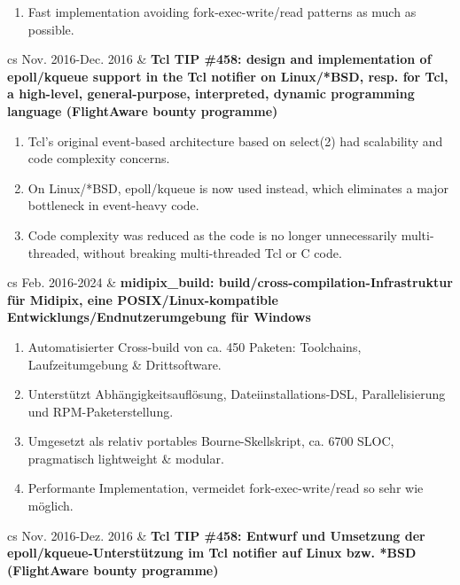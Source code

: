 \documentclass{article}
\begin{document}
\begin{table}
{\begin{enumerate}
      \item Fast implementation avoiding fork-exec-write/read patterns as much as possible.
    \end{enumerate}
    \begin{tabularx}{\linewidth}{cs}
      Nov. 2016-Dec. 2016 & \bf{Tcl TIP \#458: design and implementation of epoll/kqueue support in the Tcl notifier on Linux/*BSD, resp. for Tcl, a high-level, general-purpose, interpreted, dynamic programming language (FlightAware bounty programme)}
    \end{tabularx}
    \begin{enumerate}
      \item Tcl's original event-based architecture based on select(2) had scalability and code complexity concerns.
      \item On Linux/*BSD, epoll/kqueue is now used instead, which eliminates a major bottleneck in event-heavy code.
      \item Code complexity was reduced as the code is no longer unnecessarily multi-threaded, without breaking multi-threaded Tcl or C code.
    \end{enumerate}
  }{
    \caption{Projektbeteiligungen}
    \begin{tabularx}{\linewidth}{cs}
      Feb. 2016-2024 & \bf{midipix\_build: build/cross-compilation-Infrastruktur für Midipix, eine POSIX/Linux-kompatible Entwicklungs/Endnutzerumgebung für Windows}
    \end{tabularx}
    \begin{enumerate}
      \item Automatisierter Cross-build von ca. 450 Paketen: Toolchains, Laufzeitumgebung \& Drittsoftware.
      \item Unterstützt Abhängigkeitsauflösung, Dateiinstallations-DSL, Parallelisierung und RPM-Paketerstellung.
      \item Umgesetzt als relativ portables Bourne-Skellskript, ca. 6700 SLOC, pragmatisch lightweight \& modular.
      \item Performante Implementation, vermeidet fork-exec-write/read so sehr wie möglich.
    \end{enumerate}
    \begin{tabularx}{\linewidth}{cs}
      Nov. 2016-Dez. 2016 & \bf{Tcl TIP \#458: Entwurf und Umsetzung der epoll/kqueue-Unterstützung im Tcl notifier auf Linux bzw. *BSD (FlightAware bounty programme)}
    \end{tabularx}
    \begin{enumerate}

\end{enumerate}}
\end{table}
\end{document}
